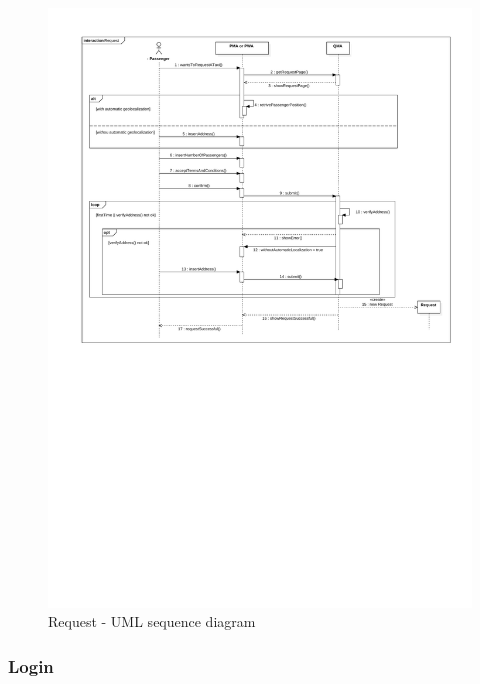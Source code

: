 \begin{landscape}

\begin{figure}[H]
\begin{centering}
\includegraphics[bb=20bp 300bp 595bp 842bp,scale=0.7]{specific-requirements/3.4-use-cases/image/request}
\par\end{centering}

\protect\caption{Request - UML sequence diagram}
\end{figure}


\end{landscape}

\clearpage{}


\subsubsection{Login}


